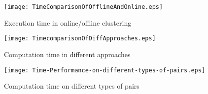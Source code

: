 
\begin{figure}[th]
 \centerline{
 \texttt{[image: TimeComparisonOfOfflineAndOnline.eps]}}
 \caption{Execution time in online/offline clustering}
 \label{fig:TimeComparisonOfOfflineAndOnline}
\end{figure}

\begin{figure}[th]
 \centerline{
 \texttt{[image: TimecomparisonOfDiffApproaches.eps]}}
 \caption{Computation time in different approaches}
 \label{fig:TimecomparisonOfDiffApproaches}
\end{figure}

\begin{figure}[th]
 \centerline{
 \texttt{[image: Time-Performance-on-different-types-of-pairs.eps]}}
 \caption{Computation time on different types of pairs}
 \label{fig:Time-Performance-on-different-types-of-pairs}
\end{figure}


